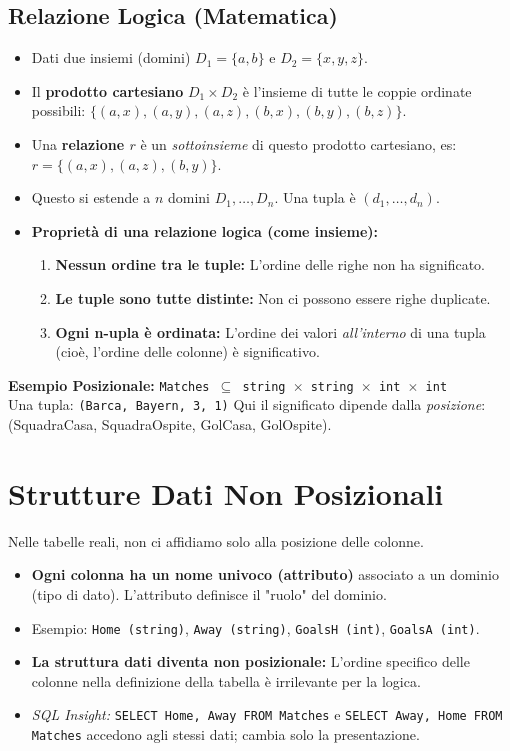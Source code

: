 	\subsection{Relazione Logica (Matematica)}
	\begin{itemize}
		\item Dati due insiemi (domini) $D_1 = \{a,b\}$ e $D_2 = \{x,y,z\}$.
		\item Il \textbf{prodotto cartesiano} $D_1 \times D_2$ è l'insieme di tutte le coppie ordinate possibili: $\{(a,x), (a,y), (a,z), (b,x), (b,y), (b,z)\}$.
		\item Una \textbf{relazione $r$} è un \textit{sottoinsieme} di questo prodotto cartesiano, es: $r = \{(a,x), (a,z), (b,y)\}$.
		\item Questo si estende a $n$ domini $D_1, \dots, D_n$. Una tupla è $(d_1, \dots, d_n)$.
		\item \textbf{Proprietà di una relazione logica (come insieme):}
		\begin{enumerate}
			\item \textbf{Nessun ordine tra le tuple:} L'ordine delle righe non ha significato.
			\item \textbf{Le tuple sono tutte distinte:} Non ci possono essere righe duplicate.
			\item \textbf{Ogni n-upla è ordinata:} L'ordine dei valori \textit{all'interno} di una tupla (cioè, l'ordine delle colonne) è significativo.
		\end{enumerate}
	\end{itemize}
	\textbf{Esempio Posizionale:}
	\texttt{Matches $\subseteq$ string $\times$ string $\times$ int $\times$ int} \\
	Una tupla: \texttt{(Barca, Bayern, 3, 1)}
	Qui il significato dipende dalla \textit{posizione}: (SquadraCasa, SquadraOspite, GolCasa, GolOspite).
	
	\section{Strutture Dati Non Posizionali}
	Nelle tabelle reali, non ci affidiamo solo alla posizione delle colonne.
	\begin{itemize}
		\item \textbf{Ogni colonna ha un nome univoco (attributo)} associato a un dominio (tipo di dato). L'attributo definisce il "ruolo" del dominio.
		\item Esempio: \texttt{Home (string)}, \texttt{Away (string)}, \texttt{GoalsH (int)}, \texttt{GoalsA (int)}.
		\item \textbf{La struttura dati diventa non posizionale:} L'ordine specifico delle colonne nella definizione della tabella è irrilevante per la logica.
		\item \textit{SQL Insight:} \texttt{SELECT Home, Away FROM Matches} e \texttt{SELECT Away, Home FROM Matches} accedono agli stessi dati; cambia solo la presentazione.
	\end{itemize}
	
